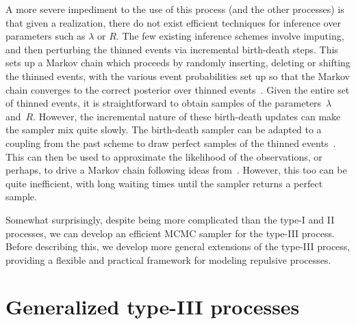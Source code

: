 \documentclass{statsoc}
\begin{document}
A more severe impediment to the use of this process (and the other \matern processes) is that given a realization,
there do not exist efficient techniques for inference over parameters 
such as $\lambda$ or $R$. The few existing inference schemes involve imputing, and then perturbing the 
thinned events via 
incremental birth-death steps. This sets up a Markov chain which proceeds by randomly inserting, deleting or shifting the thinned events, with
the various event probabilities set up so that the Markov chain converges to the correct posterior over thinned events~\citep{moller10, Hube:Wolp:2009, adamsthesis}. 
Given the entire set of thinned events, it is straightforward to obtain samples of
the parameters~$\lambda$ and~$R$. However, the incremental nature of these 
birth-death updates can make the sampler mix quite slowly. The birth-death sampler can be adapted to a coupling from
the past scheme to draw perfect samples of the thinned events~\citep{Hube:Wolp:2009}. This can then be used to approximate the likelihood of the \matern observations, or perhaps, to 
drive a Markov chain following ideas from~\cite{AndRob10}. However, this too can be quite inefficient, 
with long waiting times until the sampler returns a perfect sample.

Somewhat surprisingly, despite being more complicated than the type-I and II processes, 
we can develop an efficient MCMC sampler for the type-III process.
Before describing this, we develop more general extensions of the \matern type-III process, providing a flexible and practical 
framework for modeling repulsive processes.


\section{Generalized \matern type-III processes} \label{sec:gen_mat}
\end{document}
